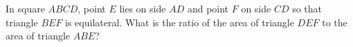 In square $ABCD$, point $E$ lies on side $AD$ and point $F$ on side $CD$ so that triangle $BEF$ is equilateral. What is the ratio of the area of triangle $DEF$ to the area of triangle $ABE$?
